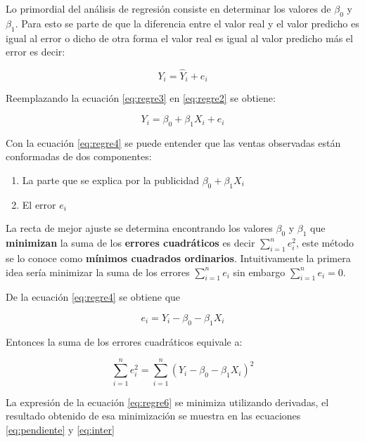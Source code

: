 \documentclass[letterpaper,]{book}
\providecommand{\tightlist}{%
  \setlength{\itemsep}{0pt}\setlength{\parskip}{0pt}}
\begin{document}
Lo primordial del análisis de regresión consiste en determinar los valores de \(\beta_0\) y \(\beta_1\). Para esto se parte de que la diferencia entre el valor real y el valor predicho es igual al error o dicho de otra forma el valor real es igual al valor predicho más el error es decir:

\begin{equation}
Y_i=\hat{Y}_i+e_i 
    \label{eq:regre3}
\end{equation}

Reemplazando la ecuación \eqref{eq:regre3} en \eqref{eq:regre2} se obtiene:

\begin{equation}
Y_i=\beta_0 + \beta_1 X_i+e_i 
    \label{eq:regre4}
\end{equation}

Con la ecuación \eqref{eq:regre4} se puede entender que las ventas observadas están conformadas de dos componentes:

\begin{enumerate}
\def\labelenumi{\arabic{enumi}.}
\tightlist
\item
  La parte que se explica por la publicidad \(\beta_0 + \beta_1 X_i\)
\item
  El error \(e_i\)
\end{enumerate}

La recta de mejor ajuste se determina encontrando los valores \(\beta_0\) y \(\beta_1\) que \textbf{minimizan} la suma de los \textbf{errores cuadráticos} es decir \(\sum_{i=1}^{n}{e_i^2}\), este método se lo conoce como \textbf{mínimos cuadrados ordinarios}. Intuitivamente la primera idea sería minimizar la suma de los errores \(\sum_{i=1}^{n}{e_i}\) sin embargo \(\sum_{i=1}^{n}{e_i}=0\).

De la ecuación \eqref{eq:regre4} se obtiene que

\begin{equation}
e_i = Y_i-\beta_0 - \beta_1 X_i
    \label{eq:regre5}
\end{equation}

Entonces la suma de los errores cuadráticos equivale a:

\begin{equation}
\sum_{i=1}^{n}{e_i^2} = \sum_{i=1}^{n}{\left(Y_i-\beta_0 - \beta_1 X_i\right)^2}
    \label{eq:regre6}
\end{equation}

La expresión de la ecuación \eqref{eq:regre6} se minimiza utilizando derivadas, el resultado obtenido de esa minimización se muestra en las ecuaciones \eqref{eq:pendiente} y \eqref{eq:inter}
\end{document}
